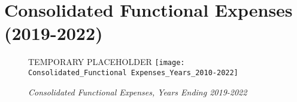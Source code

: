 
\chapter{Consolidated Functional Expenses (2019-2022)}%
\label{ch:consolidated_functional_expenses_2019-2022}


\begin{sidewaysfigure}
  \caption[Consolidated Functional Expenses, Years Ending 2019–2022]{\textit{Consolidated Functional Expenses, Years Ending 2019-2022}}\label{fig:consolidated_functional_expenses_2019-2022} %
  TEMPORARY PLACEHOLDER
  \texttt{[image: Consolidated\_Functional Expenses\_Years\_2010-2022]} %
\end{sidewaysfigure}

